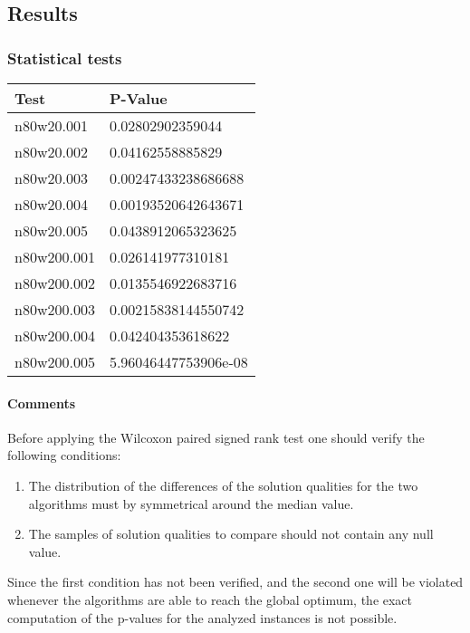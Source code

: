 \subsection{Results} 

\subsubsection{Statistical tests}
\begin{center}
\begin{tabular}{|l|l|}
\hline
\textbf{Test} & \textbf{P-Value} \\
\hline
n80w20.001 &	0.02802902359044\\
\hline
n80w20.002 &	0.04162558885829\\
\hline
n80w20.003 &	0.00247433238686688\\
\hline
n80w20.004 &	0.00193520642643671\\
\hline
n80w20.005 &	0.0438912065323625\\
\hline
n80w200.001 &	0.026141977310181\\
\hline
n80w200.002 &	0.0135546922683716\\
\hline
n80w200.003 &	0.00215838144550742\\
\hline
n80w200.004 &	0.042404353618622\\
\hline
n80w200.005 &	5.96046447753906e-08\\
\hline
\end{tabular}
\label{tab:wilcoxon}
\end{center}

\paragraph{Comments}
Before applying the Wilcoxon paired signed rank test one should verify the following conditions:
\begin{enumerate}
  \item The distribution of the differences of the solution qualities for the two algorithms must by symmetrical around the median value.
  \item The samples of solution qualities to compare should not contain any null value. 
\end{enumerate}

Since the first condition has not been verified, and the second one will be violated whenever the algorithms are able to reach the global optimum, the exact computation of the p-values for the analyzed instances is not possible.

